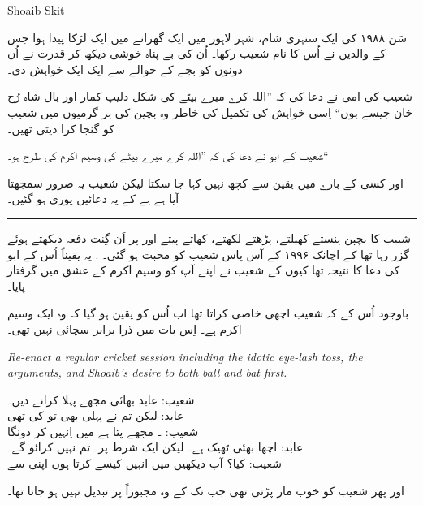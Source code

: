 \documentclass{article}
\begin{document}
\begin{center} \LARGE
	Shoaib Skit
\end{center}

\startUrdu

سَن ۱۹۸۸ کی ایک سنہری شام، شہر لاہور میں ایک گھرانے میں ایک لڑکا پیدا ہوا جس کے والدین نے اُس کا نام شعیب رکھا۔ اُن کی بے پناہ خوشی دیکھ کر قدرت نے اُن دونوں کو بچے کے حوالے سے ایک ایک خواہش دی۔ 

شعیب کی امی نے دعا کی کہ ''اللہ کرے میرے بیٹے کی شکل دلیپ کمار اور بال شاہ رُخ خان جیسے ہوں`` اِسی خواہش کی تکمیل کی خاطر وہ بچپن کی ہر گرمیوں میں شعیب کو گنجا کرا دیتی تھیں۔ \hfill {}

شعیب کے ابو نے دعا کی کہ ''اللہ کرے میرے بیٹے کی  وسیم اکرم کی طرح ہو۔``

اور کسی کے بارے میں یقین سے کچھ نہیں کہا جا سکتا لیکن شعیب یہ ضرور سمجھتا آیا ہے ہے کے یہ دعائیں پوری ہو گئیں۔

\rule{\textwidth}{1pt}

شییب کا بچپن ہنستے کھیلتے، پڑھتے لکھتے،  کھاتے پیتے اور  پر اَن گِنت دفعہ  دیکھتے ہوئے گزر رہا تھا کے اچانک ۱۹۹۶ کے آس پاس شعیب کو محبت ہو گئی۔ . یہ یقیناً اُس کے ابو کی دعا کا نتیجہ تھا کیوں کے شعیب نے اپنے آپ کو وسیم اکرم کے عشق میں گرفتار پایا۔

باوجود اُس کے کہ شعیب اچھی خاصی  کراتا تھا اب اُس کو یقین ہو گیا کہ وہ ایک  وسیم اکرم ہے۔ اِس بات میں ذرا برابر سچائی نہیں تھی۔

\begin{enpara}
	\itshape
	Re-enact a regular cricket session including the idotic eye-lash toss, the arguments, and Shoaib's desire to both ball and bat first.
\end{enpara}

\vspace{0.5\baselineskip}
شعیب:  عابد بھائی مجھے پہلا  کرانے دیں۔\\
عابد: لیکن تم نے پہلی  بھی تو کی تھی\\
شعیب: ۔ مجھے پتا ہے میں اِنہیں  کر دونگا\\
عابد: اچھا بھئی ٹھیک ہے۔ لیکن ایک شرط پر۔ تم  نہیں کرائو گے۔\\
شعیب: کیا؟ آپ دیکھیں میں انہیں کیسے  کرتا ہوں اپنی  سے

اور پھر شعیب کو خوب مار پڑتی تھی جب تک کے وہ مجبوراً  پر تبدیل نہیں ہو جاتا تھا۔
\end{document}
